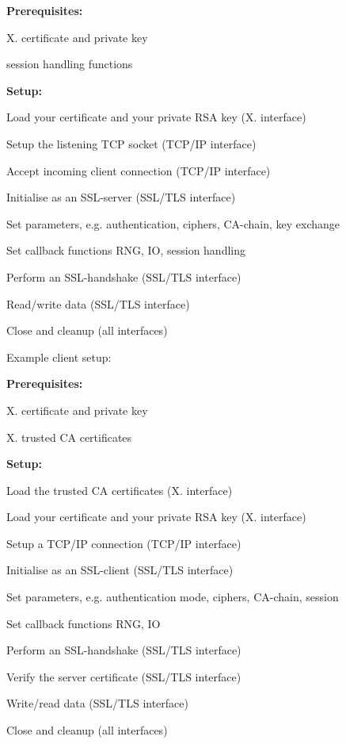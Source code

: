 {\bfseries Prerequisites\-:} 
\begin{DoxyItemize}
\item X. certificate and private key
\item session handling functions
\end{DoxyItemize}

{\bfseries Setup\-:} 
\begin{DoxyItemize}
\item Load your certificate and your private R\-S\-A key (X. interface)
\item Setup the listening T\-C\-P socket (T\-C\-P/\-I\-P interface)
\item Accept incoming client connection (T\-C\-P/\-I\-P interface)
\item Initialise as an S\-S\-L-\/server (S\-S\-L/\-T\-L\-S interface)
\begin{DoxyItemize}
\item Set parameters, e.\-g. authentication, ciphers, C\-A-\/chain, key exchange
\item Set callback functions R\-N\-G, I\-O, session handling
\end{DoxyItemize}
\item Perform an S\-S\-L-\/handshake (S\-S\-L/\-T\-L\-S interface)
\item Read/write data (S\-S\-L/\-T\-L\-S interface)
\item Close and cleanup (all interfaces)
\end{DoxyItemize}

Example client setup\-:

{\bfseries Prerequisites\-:} 
\begin{DoxyItemize}
\item X. certificate and private key
\item X. trusted C\-A certificates
\end{DoxyItemize}

{\bfseries Setup\-:} 
\begin{DoxyItemize}
\item Load the trusted C\-A certificates (X. interface)
\item Load your certificate and your private R\-S\-A key (X. interface)
\item Setup a T\-C\-P/\-I\-P connection (T\-C\-P/\-I\-P interface)
\item Initialise as an S\-S\-L-\/client (S\-S\-L/\-T\-L\-S interface)
\begin{DoxyItemize}
\item Set parameters, e.\-g. authentication mode, ciphers, C\-A-\/chain, session
\item Set callback functions R\-N\-G, I\-O
\end{DoxyItemize}
\item Perform an S\-S\-L-\/handshake (S\-S\-L/\-T\-L\-S interface)
\item Verify the server certificate (S\-S\-L/\-T\-L\-S interface)
\item Write/read data (S\-S\-L/\-T\-L\-S interface)
\item Close and cleanup (all interfaces) 
\end{DoxyItemize}